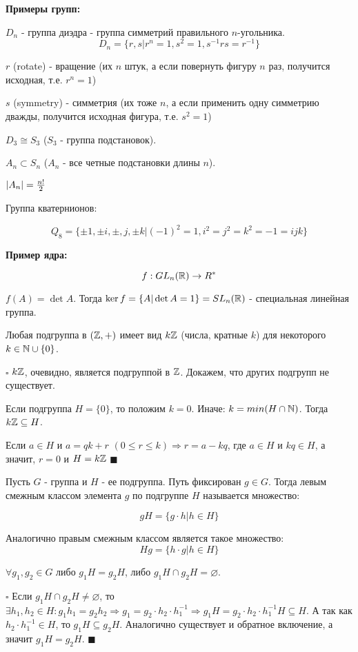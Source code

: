 \documentclass[../main.tex]{subfiles}
\begin{document}
\void
\textbf{Примеры групп:}

 $D_n$ - группа диэдра - группа симметрий правильного $n$-угольника.
$$D_n = \{r, s\vert r^n = 1, s^2 = 1, s^{-1}rs = r^{-1}\}$$

$r$ (rotate) - вращение (их $n$ штук, а если повернуть фигуру $n$ раз, получится исходная, т.е. $r^n = 1$)

$s$ (symmetry) - симметрия (их тоже $n$, а если применить одну симметрию дважды, получится исходная фигура, т.е. $s^2 = 1$)

 $D_3\cong S_3$ ($S_3$ - группа подстановок).

\void
{} $A_n\subset S_n $ ($A_n$ - все четные подстановки длины $n$).

$\vert A_n\vert = \frac{n!}{2}$

\void
{} Группа кватернионов:

$$Q_8 = \{\pm 1,\pm i,\pm, j,\pm k\vert (-1)^2 = 1, i^2 = j^2 = k^2 = -1 = ijk\}$$

\void
\textbf{Пример ядра:}

$$f: GL_n(\mathbb{R})\rightarrow R^*$$

$f(A) = \det{A}$. Тогда $\ker f = \{A\vert \det{A} = 1\} = SL_n(\mathbb{R})$ - специальная линейная группа.

\void
{} Любая подгруппа в $(\mathbb{Z}, +)$ имеет вид $k\mathbb{Z}$ (числа, кратные $k$) для некоторого $k\in \mathbb{N}\cup\{0\}$.

\void
$\square$ $k\mathbb{Z}$, очевидно, является подгруппой в $\mathbb{Z}$. Докажем, что других подгрупп не существует.

Если подгруппа $H = \{0\}$, то положим $k = 0$. Иначе: $k = min(H\cap\mathbb{N})$. Тогда $k\mathbb{Z}\subseteq H$.

Если $a\in H$ и $a = qk + r$ $(0\leq r\le k) \Rightarrow r = a - kq$, где $a\in H$ и $kq\in H$, а значит,
$r = 0$ и $H = k\mathbb{Z}$ $\blacksquare$

\void
{} Пусть $G$ - группа и $H$ - ее подгруппа. Путь фиксирован $g\in G$. Тогда левым смежным классом
элемента $g$ по подгруппе $H$ называется множество:

$$ gH = \{g\cdot h\vert h\in H\} $$

Аналогично правым смежным классом является такое множество:
$$ Hg = \{h\cdot g\vert h\in H\} $$

\void
{} $\forall g_1, g_2\in G$ либо $g_1H = g_2H$, либо $g_1H\cap g_2H = \varnothing$.

\void
$\square$ Если $g_1H\cap g_2H\neq\varnothing$, то $\exists h_1,h_2\in H: g_1h_1 = g_2h_2\Rightarrow
g_1 = g_2\cdot h_2\cdot h_1^{-1} \Rightarrow g_1H = g_2\cdot h_2\cdot h_1^{-1}H\subseteq H$.
А так как $h_2\cdot h_1^{-1}\in H$, то $g_1H\subseteq g_2H$. Аналогично существует
и обратное включение, а значит $g_1H = g_2H$. $\blacksquare$
\end{document}
